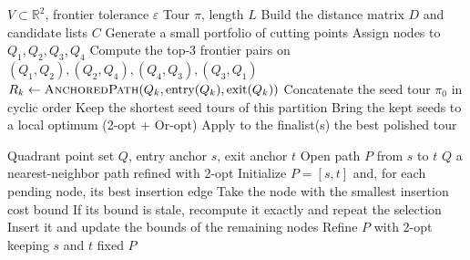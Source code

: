 \documentclass[runningheads]{llncs}
\begin{document}
\begin{algorithm}
\caption{GSPH-FC --- complete procedure}
\label{alg:gsph}
\begin{algorithmic}[1]
\Require $V\subset\mathbb{R}^2$, frontier tolerance $\varepsilon$
\Ensure Tour $\pi$, length $L$
\State Build the distance matrix $D$ and candidate lists $C$
\State Generate a small portfolio of cutting points
  \State Assign nodes to $Q_1,Q_2,Q_3,Q_4$
  \State Compute the top-3 frontier pairs on
         $(Q_1,Q_2),(Q_2,Q_4),(Q_4,Q_3),(Q_3,Q_1)$
      \State $R_k\gets\Call{AnchoredPath}{Q_k,\text{entry}(Q_k),\text{exit}(Q_k)}$
    \EndFor
    \State Concatenate the seed tour $\pi_0$ in cyclic order
  \EndFor
  \State Keep the shortest seed tours of this partition
\EndFor
\State Bring the kept seeds to a local optimum (2-opt + Or-opt)
\State Apply  to the finalist(s)
\State \Return the best polished tour
\end{algorithmic}
\end{algorithm}

\begin{algorithm}
\caption{\textsc{AnchoredPath} --- anchored intra-quadrant construction}
\label{alg:anchored}
\begin{algorithmic}[1]
\Require Quadrant point set $Q$, entry anchor $s$, exit anchor $t$
\Ensure Open path $P$ from $s$ to $t$
  \State \Return $Q$
\EndIf
{}
  \State \Return a nearest-neighbor path refined with 2-opt
\EndIf
\State Initialize $P=[s,t]$ and, for each pending node, its best insertion edge
  \State Take the node with the smallest insertion cost bound
  \State If its bound is stale, recompute it exactly and repeat the selection
  \State Insert it and update the bounds of the remaining nodes
\EndWhile
\State Refine $P$ with 2-opt keeping $s$ and $t$ fixed
\State \Return $P$
\end{algorithmic}
\end{algorithm}
\end{document}
